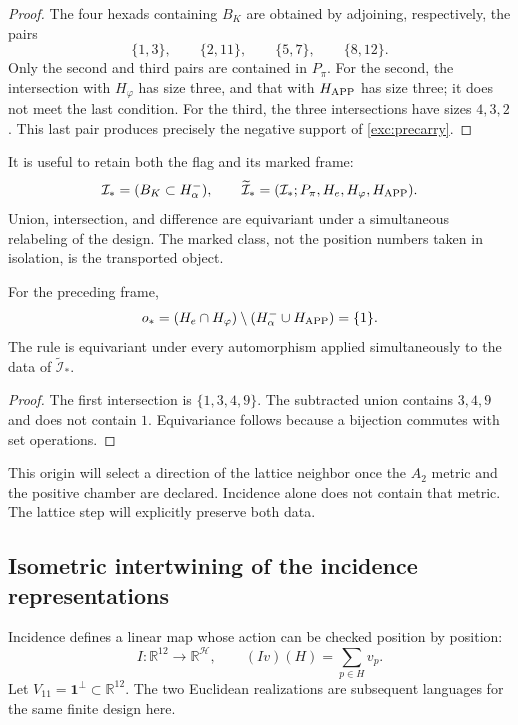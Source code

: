 \begin{proof}
The four hexads containing $B_K$ are obtained by adjoining,
respectively, the pairs
\[
 \{1,3\},\qquad\{2,11\},\qquad\{5,7\},\qquad\{8,12\}.
\]
Only the second and third pairs are contained in $P_\pi$. For the
second, the intersection with $H_\varphi$ has size three, and that with
$H_{\rm APP}$ has size three; it does not meet the last condition. For the
third, the three intersections have sizes $4,3,2$. This last pair
produces precisely the negative support of \eqref{exc:precarry}.
\end{proof}

It is useful to retain both the flag and its marked frame:
\[
 \mathcal I_*=(B_K\subset H^-_\alpha),\qquad
 \widetilde{\mathcal I}_*
   =(\mathcal I_*;P_\pi,H_e,H_\varphi,H_{\rm APP}).
\]
Union, intersection, and difference are equivariant
under a simultaneous relabeling of the design. The marked class, not the
position numbers taken in isolation, is the transported object.

\begin{lemma}
\label{exc:origen}
For the preceding frame,
\[
 o_*=(H_e\cap H_\varphi)
           \setminus(H^-_\alpha\cup H_{\rm APP})=\{1\}.
\]
The rule is equivariant under every automorphism applied simultaneously
to the data of $\widetilde{\mathcal I}_*$.
\end{lemma}

\begin{proof}
The first intersection is $\{1,3,4,9\}$. The subtracted union
contains $3,4,9$ and does not contain $1$. Equivariance follows because a
bijection commutes with set operations.
\end{proof}

This origin will select a direction of the lattice neighbor once the
$A_2$ metric and the positive chamber are declared. Incidence alone
does not contain that metric. The lattice step will explicitly preserve
both data.



\subsection{Isometric intertwining of the incidence representations}
\label{exc:entrelazador}

Incidence defines a linear map whose action can be checked
position by position:
\begin{equation}
 I:\mathbb R^{12}\longrightarrow\mathbb R^{\mathcal H},
 \qquad (Iv)(H)=\sum_{p\in H}v_p.
 \label{exc:incidencia}
\end{equation}
Let $V_{11}=\mathbf1^\perp\subset\mathbb R^{12}$. The two Euclidean
realizations are subsequent languages for the same finite design here.


